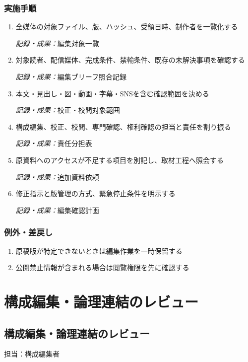 \documentclass[a4paper,11pt]{article}
\begin{document}
\subsubsection*{実施手順}
\begin{enumerate}[leftmargin=2em,itemsep=0.65em]
\item 全媒体の対象ファイル、版、ハッシュ、受領日時、制作者を一覧化する\par\noindent\textit{記録・成果：}編集対象一覧\nobreak\smallskip
\item 対象読者、配信媒体、完成条件、禁輸条件、既存の未解決事項を確認する\par\noindent\textit{記録・成果：}編集ブリーフ照合記録\nobreak\smallskip
\item 本文・見出し・図・動画・字幕・SNSを含む確認範囲を決める\par\noindent\textit{記録・成果：}校正・校閲対象範囲\nobreak\smallskip
\item 構成編集、校正、校閲、専門確認、権利確認の担当と責任を割り振る\par\noindent\textit{記録・成果：}責任分担表\nobreak\smallskip
\item 原資料へのアクセスが不足する項目を別記し、取材工程へ照会する\par\noindent\textit{記録・成果：}追加資料依頼\nobreak\smallskip
\item 修正指示と版管理の方式、緊急停止条件を明示する\par\noindent\textit{記録・成果：}編集確認計画\nobreak\smallskip
\end{enumerate}
\subsubsection*{例外・差戻し}
\begin{enumerate}[leftmargin=2em,itemsep=0.35em]
\item 原稿版が特定できないときは編集作業を一時保留する
\item 公開禁止情報が含まれる場合は閲覧権限を先に確認する
\end{enumerate}
\section{構成編集・論理連結のレビュー}
\subsection{構成編集・論理連結のレビュー}
\par 担当：構成編集者\par\medskip
\end{document}
